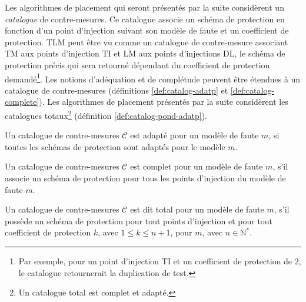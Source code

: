             Les algorithmes de placement qui seront présentés par la suite considèrent un \textit{catalogue} de contre-mesures.
            Ce catalogue associe un schéma de protection en fonction d'un point d'injection suivant son modèle de faute et un coefficient de protection.
            \gls{TLM} peut être vu comme un catalogue de contre-mesure associant \gls{TM} aux points d'injection \gls{TI} et \gls{LM} aux points d'injections \gls{DL}, le schéma de protection précis qui sera retourné dépendant du coefficient de protection demandé\footnote{Par exemple, pour un point d'injection \gls{TI} et un coefficient de protection de $2$, le catalogue retournerait la duplication de test.}.            
            Les notions d'adéquation et de complétude peuvent être étendues à un catalogue de contre-mesures (définitions \ref{def:catalog-adatp} et \ref{def:catalog-complete}).
            Les algorithmes de placement présentés par la suite considèrent les catalogues totaux\footnote{Un catalogue total est complet et adapté.} (définition \ref{def:catalog-pond-adatp}).
            
            \begin{defi}
                \label{def:catalog-adatp}
                Un catalogue de contre-mesures $\mathcal{C}$ est adapté pour un modèle de faute $m$, si toutes les schémas de protection sont adaptés pour le modèle $m$.
            \end{defi}
            
            \begin{defi}
                \label{def:catalog-complete}
                Un catalogue de contre-mesures $\mathcal{C}$ est complet pour un modèle de faute $m$, s'il associe un schéma de protection pour tous les points d'injection du modèle de faute $m$.
            \end{defi}
            
            \begin{defi}
                \label{def:catalog-pond-adatp}
                Un catalogue de contre-mesures $\mathcal{C}$ est dit total pour un modèle de faute $m$, s'il possède un schéma de protection pour tout points d'injection et pour tout coefficient de protection $k$, avec $1 \leq k \leq n+1$, pour $m$, avec $n \in \mathbb{N}^*$.
            \end{defi}

